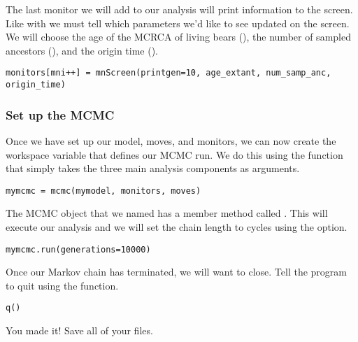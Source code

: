The last monitor we will add to our analysis will print information to the screen.
Like with  we must tell  which parameters we'd like to see updated on the screen. 
We will choose the age of the MCRCA of living bears (), the number of sampled ancestors (), and the origin time ().
{\tt \begin{snugshade*}
\begin{lstlisting}
monitors[mni++] = mnScreen(printgen=10, age_extant, num_samp_anc, origin_time)
\end{lstlisting}
\end{snugshade*}}

\medskip
\subsubsection{Set up the MCMC}

Once we have set up our model, moves, and monitors, we can now create the workspace variable that defines our MCMC run. 
We do this using the  function that simply takes the three main analysis components as arguments.
{\tt \begin{snugshade*}
\begin{lstlisting}
mymcmc = mcmc(mymodel, monitors, moves)
\end{lstlisting}
\end{snugshade*}}

The MCMC object that we named  has a member method called . 
This will execute our analysis and we will set the chain length to  cycles using the  option.
{\tt \begin{snugshade*}
\begin{lstlisting}
mymcmc.run(generations=10000)
\end{lstlisting}
\end{snugshade*}}

Once our Markov chain has terminated, we will want \RevBayes to close. 
Tell the program to quit using the  function.
{\tt \begin{snugshade*}
\begin{lstlisting}
q()
\end{lstlisting}
\end{snugshade*}}

{\begin{framed}
You made it! Save all of your files.
\end{framed}}

